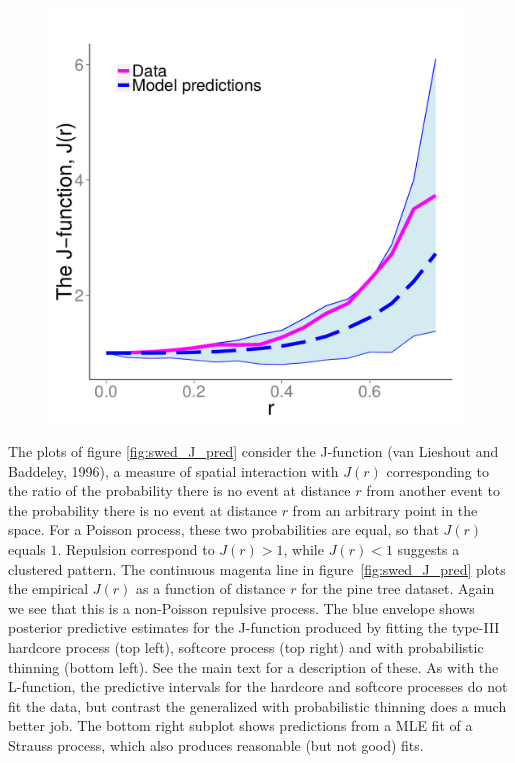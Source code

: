 \documentclass{statsoc}
\begin{document}
\begin{figure}
\begin{minipage}[h]{0.76\linewidth}
\begin{minipage}[h]{0.49\linewidth}
  \end{minipage}
  \begin{minipage}[h]{0.49\linewidth}
  \centering
  \includegraphics[width=0.98\textwidth]{figs/Jfunc_postpred_R10/swed_gibbs.pdf}
  \end{minipage}
  \end{minipage}
  \end{figure}

  The plots  of figure \ref{fig:swed_J_pred} consider the J-function (van Lieshout and Baddeley, 1996), a measure of spatial interaction with 
$J(r)$ corresponding to the ratio of the 
  probability there is no event at distance $r$ from another event to the probability there is no event at distance $r$ from an arbitrary point
  in the space. For a Poisson process, these two probabilities are equal, so that $J(r)$ equals $1$. Repulsion correspond to
  $J(r) > 1$, while $J(r)<1$ suggests a clustered pattern. 
  The continuous magenta line in figure~\ref{fig:swed_J_pred} plots the empirical $J(r)$ as a function of distance $r$ for the 
  pine tree dataset. Again we see that this is a non-Poisson repulsive process. The blue envelope shows posterior predictive estimates for the J-function 
  produced by fitting the \matern type-III hardcore process (top left), softcore process (top right) and with probabilistic thinning (bottom left). 
  See the main text for a description of these. 
  As with the L-function, the predictive intervals for the hardcore and softcore processes do not fit the data, but contrast the generalized \matern
with probabilistic thinning does a much better job. The bottom right subplot shows predictions from a MLE fit of a Strauss process, which also
produces reasonable (but not good)  fits.
\end{document}
